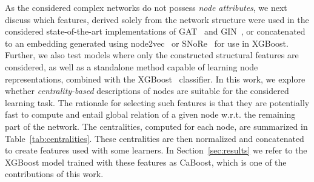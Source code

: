 \documentclass{article}
\begin{document}
\begin{table}[b!]
    \centering
    \caption{Summary of the considered learners with descriptions, where $\boldsymbol{A}$ denotes the adjacency matrix and $\boldsymbol{F}$ the feature matrix.}\vspace{0.2cm}
    \label{tab:learners}
\end{table}

As the considered complex networks do not possess \emph{node attributes}, we next discuss which features, derived solely from the network structure were used in the considered state-of-the-art implementations of GAT~\cite{velickovic2018graph} and GIN~\cite{xu2018powerful}, or concatenated to an embedding generated using node2vec~\cite{grover2016node2vec} or SNoRe~\cite{meznar2020snore} for use in XGBoost. Further, we also test models where only the constructed structural features are considered, as well as a standalone method capable of learning node representations, combined with the XGBoost~\cite{xgboost} classifier. In this work, we explore whether \emph{centrality-based} descriptions of nodes are suitable for the considered learning task. The rationale for selecting such features is that they are potentially fast to compute and entail global relation of a given node w.r.t. the remaining part of the network. The centralities, computed for each node, are summarized in Table~\ref{tab:centralities}. These centralities are then normalized and concatenated to create features used with some learners. In Section~\ref{sec:results} we refer to the XGBoost model trained with these features as CaBoost, which is one of the contributions of this work.
\end{document}
